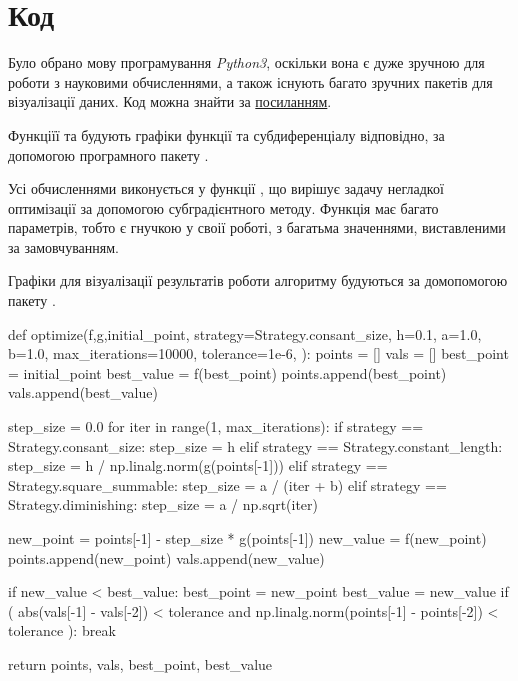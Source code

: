 \documentclass[a4paper, 14pt]{extarticle}
\begin{document}
\section{Код}
Було обрано мову програмування \emph{Python3}, оскільки 
вона є дуже зручною для роботи з науковими обчисленнями,
а також існують багато зручних пакетів для візуалізації даних.
Код можна знайти за \href{https://github.com/Oleksandra-Zhyvolovych/multivariate-knu/tree/main/subgradient}{посиланням}.

Функціїї  та  будують 
графіки функції та субдиференціалу відповідно, за допомогою
програмного пакету .

Усі обчисленнями виконується у функції , що 
вирішує задачу негладкої оптимізації за допомогою 
субградієнтного методу. Функція має багато параметрів,
тобто є гнучкою у своії роботі, з багатьма значеннями,
виставленими за замовчуванням. 

Графіки для візуалізації результатів роботи алгоритму будуються за
домопомогою пакету .

\newpage
\begin{python}
    def optimize(f,g,initial_point, strategy=Strategy.consant_size, h=0.1, a=1.0, 
    b=1.0, max_iterations=10000, tolerance=1e-6,
):
    points = []
    vals = []
    best_point = initial_point
    best_value = f(best_point)
    points.append(best_point)
    vals.append(best_value)

    step_size = 0.0
    for iter in range(1, max_iterations):
        if strategy == Strategy.consant_size:
            step_size = h
        elif strategy == Strategy.constant_length:
            step_size = h / np.linalg.norm(g(points[-1]))
        elif strategy == Strategy.square_summable:
            step_size = a / (iter + b)
        elif strategy == Strategy.diminishing:
            step_size = a / np.sqrt(iter)

        new_point = points[-1] - step_size * g(points[-1])
        new_value = f(new_point)
        points.append(new_point)
        vals.append(new_value)

        if new_value < best_value:
            best_point = new_point
            best_value = new_value
        if (
            abs(vals[-1] - vals[-2]) < tolerance
            and np.linalg.norm(points[-1] - points[-2]) < tolerance
        ):
            break

    return points, vals, best_point, best_value
\end{python}
\newpage
\end{document}
